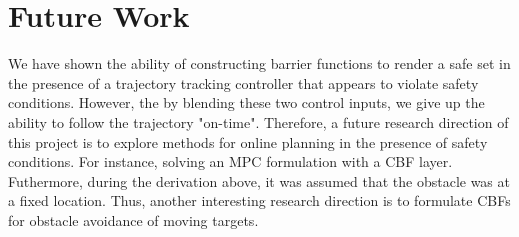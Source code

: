 \section{\textbf{Future Work}}

\noindent We have shown the ability of constructing barrier functions to render a safe set in the presence of a trajectory tracking controller that appears to violate safety conditions. However, the by blending these two control inputs, we give up the ability to follow the trajectory "on-time". Therefore, a future research direction of this project is to explore methods for online planning in the presence of safety conditions. For instance, solving an MPC formulation with a CBF layer. Futhermore, during the derivation above, it was assumed that the obstacle was at a fixed location. Thus, another interesting research direction is to formulate CBFs for obstacle avoidance of moving targets. 